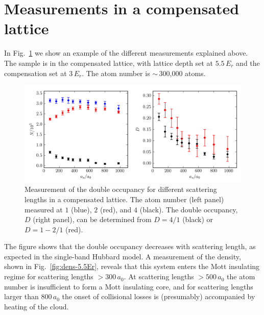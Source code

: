 \section{Measurements in a compensated lattice} 

In Fig.~\ref{fig:docc-5.5Er} we show an example of the different measurements
explained above.  The sample is in the compensated lattice,   with lattice
depth set at $5.5\,E_{r}$ and the compensation set at $3\,E_{r}$.  The atom
number is $\sim\,$300,000 atoms.   
\begin{figure}
\centering
\includegraphics[width=\textwidth]{../figures/double_occ/insitu_docc_measurement.png}
\caption[Double occupancy measurement]{Measurement of the double occupancy for
different scattering lengths in a compensated lattice.  The atom number (left
panel) measured at $\boxed{1}$ (blue), $\boxed{2}$ (red), and $\boxed{4}$
(black).  The double occupancy, $D$ (right panel), can be determined from
$D=\boxed{4}/\boxed{1}$ (black) or $D=1-\boxed{2}/\boxed{1}$ (red).} 
\label{fig:docc-5.5Er}
\end{figure}
The figure shows that the double occupancy decreases with scattering length, as
expected in the single-band Hubbard model.  A measurement of the density, shown
in Fig.~\ref{fig:dens-5.5Er}, reveals that this system enters the Mott
insulating regime for scattering lengths $>300\,a_{0}$.   At scattering lengths
$>500\,a_{0}$ the atom number is insufficient to form a Mott insulating core,
and for scattering lengths larger than $800\,a_{0}$ the onset of collisional
losses is (presumably) accompanied by heating of the cloud.  
